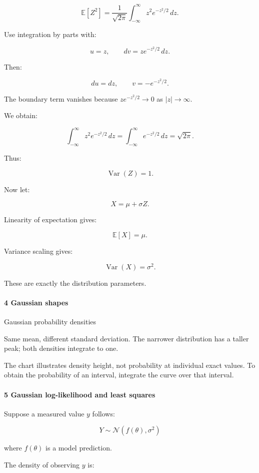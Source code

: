 \[
 \mathbb E[Z^2] = \frac1{\sqrt{2\pi}} \int_{-\infty}^{\infty}z^2e^{-z^2/2}\,dz.
\]

Use integration by parts with:

\[
 u=z,\qquad dv=ze^{-z^2/2}\,dz.
\]

Then:

\[
 du=dz, \qquad v=-e^{-z^2/2}.
\]

The boundary term vanishes because \(ze^{-z^2/2}\to0\) as \(|z|\to\infty\).

We obtain:

\[
 \int_{-\infty}^{\infty}z^2e^{-z^2/2}\,dz = \int_{-\infty}^{\infty}e^{-z^2/2}\,dz =\sqrt{2\pi}.
\]

Thus:

\[
 \boxed{\operatorname{Var}(Z)=1}.
\]

Now let:

\[
 X=\mu+\sigma Z.
\]

Linearity of expectation gives:

\[
 \mathbb E[X]=\mu.
\]

Variance scaling gives:

\[
 \operatorname{Var}(X)=\sigma^2.
\]

These are exactly the distribution parameters.

\paragraph{4 Gaussian shapes}\label{gaussian-shapes}

Gaussian probability densities

Same mean, different standard deviation. The narrower distribution has a taller peak; both densities integrate to one.

The chart illustrates density height, not probability at individual exact values. To obtain the probability of an interval, integrate the curve over that interval.

\paragraph{5 Gaussian log-likelihood and least squares}\label{gaussian-log-likelihood-and-least-squares}

Suppose a measured value \(y\) follows:

\[
 Y\sim\mathcal N(f(\theta),\sigma^2)
\]

where \(f(\theta)\) is a model prediction.

The density of observing \(y\) is:

